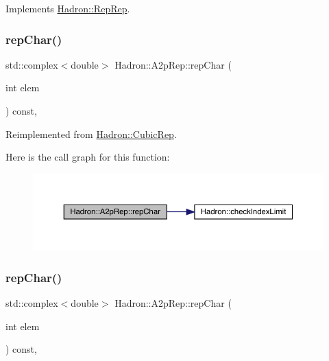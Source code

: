 Implements \mbox{\hyperlink{structHadron_1_1RepRep_ab3213025f6de249f7095892109575fde}{Hadron\+::\+Rep\+Rep}}.

\mbox{\label{structHadron_1_1A2pRep_a7e7d7668295318bf08c6ab79ce2208e6}} 
\subsubsection{\texorpdfstring{repChar()}{repChar()}\hspace{0.1cm}{\footnotesize\ttfamily [1/2]}}
{\footnotesize\ttfamily std\+::complex$<$double$>$ Hadron\+::\+A2p\+Rep\+::rep\+Char (\begin{DoxyParamCaption}\item[{int}]{elem }\end{DoxyParamCaption}) const\hspace{0.3cm}{\ttfamily [inline]}, {\ttfamily [virtual]}}



Reimplemented from \mbox{\hyperlink{structHadron_1_1CubicRep_af45227106e8e715e84b0af69cd3b36f8}{Hadron\+::\+Cubic\+Rep}}.

Here is the call graph for this function\+:
\nopagebreak
\begin{figure}[H]
\begin{center}
\leavevmode
\includegraphics[width=350pt]{d4/d33/structHadron_1_1A2pRep_a7e7d7668295318bf08c6ab79ce2208e6_cgraph}
\end{center}
\end{figure}
\mbox{\label{structHadron_1_1A2pRep_a7e7d7668295318bf08c6ab79ce2208e6}} 
\subsubsection{\texorpdfstring{repChar()}{repChar()}\hspace{0.1cm}{\footnotesize\ttfamily [2/2]}}
{\footnotesize\ttfamily std\+::complex$<$double$>$ Hadron\+::\+A2p\+Rep\+::rep\+Char (\begin{DoxyParamCaption}\item[{int}]{elem }\end{DoxyParamCaption}) const\hspace{0.3cm}{\ttfamily [inline]}, {\ttfamily [virtual]}}




